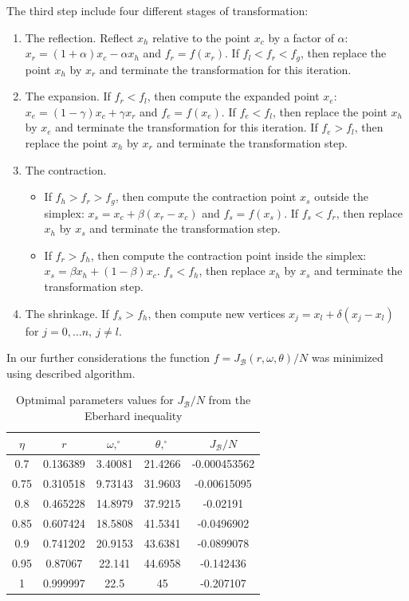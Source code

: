 \documentclass[%
master,         %
subf,           %
href,           %
colorlinks=true %
]{disser}
\numberwithin{equation}{section}
\numberwithin{figure}{section}
\begin{document}
The third step include four different stages of transformation:
\begin{enumerate}
\item The reflection. Reflect $x_h$ relative to the point $x_c$ by a factor of $\alpha$: $x_r = (1+\alpha)x_c - \alpha x_h$ and $f_r = f(x_r)$. If $f_l < f_r < f_g$, then replace the point $x_h$ by $x_r$ and terminate the transformation for this iteration.
\item The expansion. If $f_r < f_l$, then compute the expanded point $x_e$: $x_e = (1-\gamma)x_c + \gamma x_r$ and $f_e = f(x_e)$. If $f_e < f_l$, then replace the point $x_h$ by $x_e$ and terminate the transformation for this iteration. If $f_e > f_l$, then replace the point $x_h$ by $x_r$ and terminate the transformation step.
\item The contraction. 
\begin{itemize}
\item If $f_h > f_r > f_g$, then compute the contraction point $x_s$ outside the simplex: $x_s = x_c + \beta (x_r - x_c)$ and $f_s = f(x_s)$. If $f_s < f_r$, then replace $x_h$ by $x_s$ and terminate the transformation step.
\item If $f_r > f_h$, then compute the contraction point inside the simplex: $ x_s = \beta x_h + (1-\beta) x_c$. $f_s < f_h$, then replace $x_h$ by $x_s$ and terminate the transformation step.
\end{itemize}
\item The shrinkage. If $f_s > f_h$, then compute new vertices $x_j = x_l + \delta (x_j - x_l)$ for $j = 0, \ldots n, \ j \neq l$.
\end{enumerate}

In our further considerations the function $f = J_{\mathcal{B}}(r, \omega, \theta) / N$ was minimized using described algorithm.

\begin{table}[h]
\centering
\begin{tabular}{|c|c|c|c|c|}
\hline
$\eta$ & $r$ & $\omega,^\circ$ & $\theta,^\circ$ & $J_{\mathcal{B}} / N$
\\\hline
0.7 & 0.136389 & 3.40081 & 21.4266 & -0.000453562\\\hline
0.75 & 0.310518 & 9.73143 & 31.9603 & -0.00615095\\\hline
0.8 & 0.465228 & 14.8979 & 37.9215 & -0.02191\\\hline
0.85 & 0.607424 & 18.5808 & 41.5341 & -0.0496902\\\hline
0.9 & 0.741202 & 20.9153 & 43.6381 & -0.0899078\\\hline
0.95 & 0.87067 & 22.141 & 44.6958 & -0.142436\\\hline
1 & 0.999997 & 22.5 & 45 & -0.207107\\\hline
\end{tabular}
\caption{Optmimal parameters values for $J_{\mathcal{B}} / N$ from the Eberhard inequality}
\label{tab:Eberhard_repeat}
\end{table}
\end{document}
